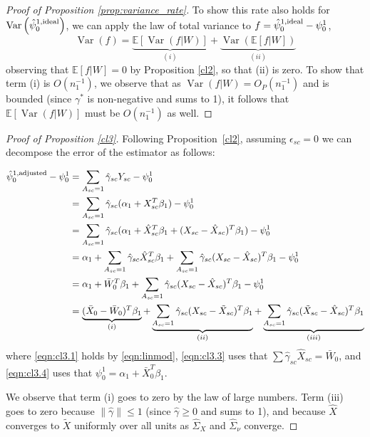 \documentclass[aoas]{imsart}
\theoremstyle{plain}
\theoremstyle{remark}
\begin{document}
\begin{appendix}
\begin{proof}[Proof of Proposition \ref{prop:variance_rate}]
To show this rate also holds for $\operatorname{Var}\left(\hat{\psi}_0^{1,\textup{ideal}}\right)$, we can apply the law of total variance to $f = \hat{\psi}_0^{1,\textup{ideal}} - \psi_0^1$, %
\[ \operatorname{Var}(f) = \underbrace{\mathbb{E}[\operatorname{Var}(f|W)]}_{(i)} + \underbrace{\operatorname{Var}(\mathbb{E}[f|W])}_{(ii)} \]
observing that $\mathbb{E}[f|W] = 0$ by Proposition \ref{cl2}, so that (ii) is zero. To show that term (i) is $O(n_1^{-1})$, we observe that as $\operatorname{Var}(f|W) = O_P(n_1^{-1})$ and is bounded (since $\gamma^*$ is non-negative and sums to 1), it follows that  $\mathbb{E}[ \operatorname{Var}(f|W)]$ must be $O(n_1^{-1})$ as well.
\end{proof}

\begin{proof}[Proof of Proposition \ref{cl3}]
Following Proposition~\ref{cl2}, assuming $\epsilon_{sc}=0$ we can decompose the error of the estimator as follows:

\begin{align}
\nonumber    \hat{\psi}^{1,\textup{adjusted}}_0 - \psi_0^1 &= \sum_{A_{sc}=1} \hat{\gamma}_{sc} Y_{sc} - \psi_0^1 \\
    & = \sum_{A_{sc}=1} \hat{\gamma}_{sc} (\alpha_1 + X_{sc}^T \beta_1) - \psi_0^1 \label{eqn:cl3.1}\\
    \nonumber & = \sum_{A_{sc}=1} \hat{\gamma}_{sc} (\alpha_1 + \hat{X}_{sc}^T \beta_1 + (X_{sc} - \hat{X}_{sc})^T \beta_1 ) - \psi_0^1 \label{eqn:cl3.2}\\
    \nonumber & = \alpha_1 + \sum_{A_{sc}=1} \hat{\gamma}_{sc} \hat{X}_{sc}^T \beta_1 + \sum_{A_{sc}=1} \hat{\gamma}_{sc}(X_{sc} - \hat{X}_{sc})^T \beta_1  - \psi_0^1 \label{eqn:cl3.3}\\
    & = \alpha_1 + \bar{W}_0^T \beta_1 + \sum_{A_{sc}=1} \hat{\gamma}_{sc}(X_{sc} - \hat{X}_{sc})^T \beta_1  - \psi_0^1 \label{eqn:cl3.3}\\
    & = \underbrace{(\bar{X}_0 - \bar{W}_0)^T \beta_1}_{(i)} + \underbrace{\sum_{A_{sc}=1} \hat{\gamma}_{sc}(X_{sc} - \tilde{X}_{sc})^T \beta_1}_{(ii)} + \underbrace{\sum_{A_{sc}=1} \hat{\gamma}_{sc} (\tilde{X}_{sc} - \hat{X}_{sc})^T \beta_1}_{(iii)} \label{eqn:cl3.4}
\end{align}
where \eqref{eqn:cl3.1} holds by \eqref{eqn:linmod}, \eqref{eqn:cl3.3} uses that $\sum \hat{\gamma}_{sc} \hat{X}_{sc} = \bar{W}_0$, and \eqref{eqn:cl3.4} uses that $\psi_{0}^1 = \alpha_1 + \bar{X}_0^T \beta_1$.

We observe that term (i) goes to zero by the law of large numbers. Term (iii) goes to zero because $\|\hat{\gamma}\| \leq 1$ (since $\hat{\gamma} \geq 0$ and sums to 1), and because $\hat{X}$ converges to $\tilde{X}$ uniformly over all units as $\hat{\Sigma}_X$ and $\hat{\Sigma}_{\nu}$ converge. 


\end{proof}
\end{appendix}
\end{document}
